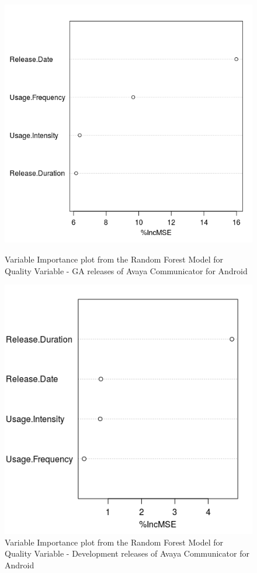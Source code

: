 \documentclass[smallcondensed]{svjour3}     %
\begin{document}
\begin{figure}[!t]
\begin{minipage}{.45\textwidth}
\raggedleft
\includegraphics[width=\linewidth]{rfqAGA}
\caption{Variable Importance plot from the Random Forest  Model for Quality Variable - GA releases of Avaya Communicator for Android}
\label{fig:rf2AGA}
\end{minipage}
\hfill
\begin{minipage}{.45\textwidth}
\raggedright 
\includegraphics[width=\linewidth]{rfqAD}
\caption{Variable Importance plot from the Random Forest  Model for Quality Variable - Development releases of Avaya Communicator for Android}
\label{fig:rf2AD}
\end{minipage}
\end{figure}
\end{document}
